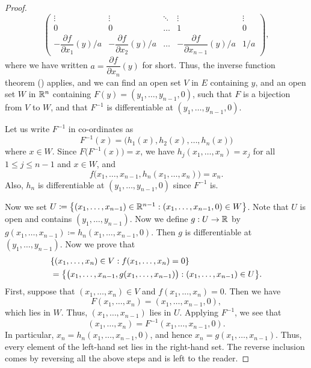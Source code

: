\begin{proof}
\[\begin{pmatrix}
      \vdots                                   & \vdots                                   & \ddots & \vdots                                         & \vdots \\
      0                                        & 0                                        & \dots  & 1                                              & 0      \\
      -\dfrac{\partial f}{\partial x_1}(y) / a & -\dfrac{\partial f}{\partial x_2}(y) / a & \dots  & -\dfrac{\partial f}{\partial x_{n - 1}}(y) / a & 1 / a
    \end{pmatrix},
  \]
  where we have written \(a = \dfrac{\partial f}{\partial x_n}(y)\) for short.
  Thus, the inverse function theorem () applies, and we can find an open set \(V\) in \(E\) containing \(y\), and an open set \(W\) in \(\mathbb{R}^n\) containing \(F(y) = (y_1, \dots, y_{n - 1}, 0)\), such that \(F\) is a bijection from \(V\) to \(W\), and that \(F^{-1}\) is differentiable at \((y_1, \dots, y_{n - 1}, 0)\).

  Let us write \(F^{-1}\) in co-ordinates as
  \[
    F^{-1}(x) = \big(h_1(x), h_2(x), \dots, h_n(x)\big)
  \]
  where \(x \in W\).
  Since \(F\big(F^{-1}(x)\big) = x\), we have \(h_j(x_1, \dots, x_n) = x_j\) for all \(1 \leq j \leq n - 1\) and \(x \in W\), and
  \[
    f\big(x_1, \dots, x_{n - 1}, h_n(x_1, \dots, x_n)\big) = x_n.
  \]
  Also, \(h_n\) is differentiable at \((y_1, \dots, y_{n - 1}, 0)\) since \(F^{-1}\) is.

  Now we set \(U \coloneqq \left\lbrace(x_1, \dots, x_{n - 1}) \in \mathbb{R}^{n - 1} : (x_1, \dots, x_{n - 1}, 0) \in W\right\rbrace\).
  Note that \(U\) is open and contains \((y_1, \dots, y_{n - 1})\).
  Now we define \(g : U \to \mathbb{R}\) by \(g(x_1, \dots, x_{n - 1}) \coloneqq h_n(x_1, \dots, x_{n - 1}, 0)\).
  Then \(g\) is differentiable at \((y_1, \dots, y_{n - 1})\).
  Now we prove that
  \begin{align*}
     & \set{(x_1, \dots, x_n) \in V : f(x_1, \dots, x_n) = 0}                                             \\
     & = \set{\big(x_1, \dots, x_{n - 1}, g(x_1, \dots, x_{n - 1})\big) : (x_1, \dots, x_{n - 1}) \in U}.
  \end{align*}
  First, suppose that \((x_1, \dots, x_n) \in V\) and \(f(x_1, \dots, x_n) = 0\).
  Then we have
  \[
    F(x_1, \dots, x_n) = (x_1, \dots, x_{n - 1}, 0),
  \]
  which lies in \(W\).
  Thus, \((x_1, \dots, x_{n - 1})\) lies in \(U\).
  Applying \(F^{-1}\), we see that
  \[
    (x_1, \dots, x_n) = F^{-1}(x_1, \dots, x_{n - 1}, 0).
  \]
  In particular, \(x_n = h_n(x_1, \dots, x_{n - 1}, 0)\), and hence \(x_n = g(x_1, \dots, x_{n - 1})\).
  Thus, every element of the left-hand set lies in the right-hand set.
  The reverse inclusion comes by reversing all the above steps and is left to the reader.


\end{proof}
